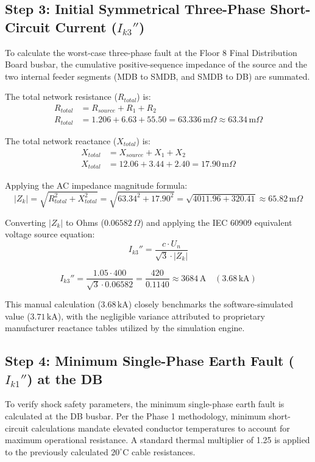 \documentclass[11pt, a4paper]{article}
\begin{document}
\subsection{Step 3: Initial Symmetrical Three-Phase Short-Circuit Current ($I_{k3}''$)}
To calculate the worst-case three-phase fault at the Floor 8 Final Distribution Board busbar, the cumulative positive-sequence impedance of the source and the two internal feeder segments (MDB to SMDB, and SMDB to DB) are summated.

The total network resistance ($R_{total}$) is:
\begin{align}
    R_{total} &= R_{source} + R_1 + R_2 \\
    R_{total} &= 1.206 + 6.63 + 55.50 = 63.336 \, \text{m}\Omega \approx 63.34 \, \text{m}\Omega
\end{align}

The total network reactance ($X_{total}$) is:
\begin{align}
    X_{total} &= X_{source} + X_1 + X_2 \\
    X_{total} &= 12.06 + 3.44 + 2.40 = 17.90 \, \text{m}\Omega
\end{align}

Applying the AC impedance magnitude formula:
\begin{equation}
    |Z_k| = \sqrt{R_{total}^2 + X_{total}^2} = \sqrt{63.34^2 + 17.90^2} = \sqrt{4011.96 + 320.41} \approx 65.82 \, \text{m}\Omega
\end{equation}

Converting $|Z_k|$ to Ohms ($0.06582 \, \Omega$) and applying the IEC 60909 equivalent voltage source equation:
\begin{equation}
    I_{k3}'' = \frac{c \cdot U_n}{\sqrt{3} \cdot |Z_k|}
\end{equation}

\begin{equation}
    I_{k3}'' = \frac{1.05 \cdot 400}{\sqrt{3} \cdot 0.06582} = \frac{420}{0.1140} \approx 3684 \, \text{A} \quad (3.68 \, \text{kA})
\end{equation}

This manual calculation ($3.68 \, \text{kA}$) closely benchmarks the software-simulated value ($3.71 \, \text{kA}$), with the negligible variance attributed to proprietary manufacturer reactance tables utilized by the simulation engine.
\subsection{Step 4: Minimum Single-Phase Earth Fault ($I_{k1}''$) at the DB}
To verify shock safety parameters, the minimum single-phase earth fault is calculated at the DB busbar. Per the Phase 1 methodology, minimum short-circuit calculations mandate elevated conductor temperatures to account for maximum operational resistance. A standard thermal multiplier of 1.25 is applied to the previously calculated $20^{\circ}\text{C}$ cable resistances.
\end{document}
